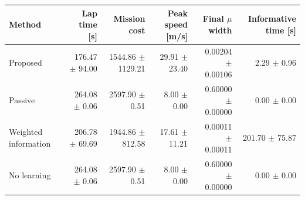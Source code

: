 \begin{tabular}{lrrrrr}
\toprule
Method & Lap time [s] & Mission cost & Peak speed [m/s] & Final $\mu$ width & Informative time [s] \\
\midrule
Proposed & 176.47 $\pm$ 94.00 & 1544.86 $\pm$ 1129.21 & 29.91 $\pm$ 23.40 & 0.00204 $\pm$ 0.00106 & 2.29 $\pm$ 0.96 \\
Passive & 264.08 $\pm$ 0.06 & 2597.90 $\pm$ 0.51 & 8.00 $\pm$ 0.00 & 0.60000 $\pm$ 0.00000 & 0.00 $\pm$ 0.00 \\
Weighted information & 206.78 $\pm$ 69.69 & 1944.86 $\pm$ 812.58 & 17.61 $\pm$ 11.21 & 0.00011 $\pm$ 0.00011 & 201.70 $\pm$ 75.87 \\
No learning & 264.08 $\pm$ 0.06 & 2597.90 $\pm$ 0.51 & 8.00 $\pm$ 0.00 & 0.60000 $\pm$ 0.00000 & 0.00 $\pm$ 0.00 \\
\bottomrule
\end{tabular}

